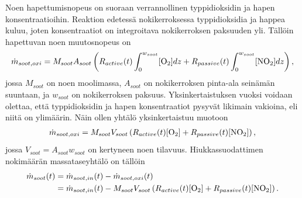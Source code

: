 Noen hapettumisnopeus on suoraan verrannollinen typpidioksidin ja hapen konsentraatioihin. Reaktion edetessä nokikerroksessa typpidioksidia ja happea kuluu, joten konsentraatiot on integroitava nokikerroksen paksuuden yli. Tällöin hapettuvan noen muutosnopeus on
\begin{align}
    \dot{m}_{soot, oxi} = M_{soot} A_{soot}\left(R_{active}(t) \int_0^{w_{soot}} [\ce{O2}] dz +
                                                R_{passive}(t) \int_0^{w_{soot}} [\ce{NO2}] dz
    \right),
\end{align}
jossa \(M_{soot}\) on noen moolimassa, \(A_{soot}\) on nokikerroksen pinta-ala seinämän suuntaan, ja \(w_{soot}\) on nokikerroksen paksuus. Yksinkertaistuksen vuoksi voidaan olettaa, että typpidioksidin ja hapen konsentraatiot pysyvät likimain vakioina, eli niitä on ylimäärin. Näin ollen yhtälö yksinkertaistuu muotoon
\begin{align}
    \dot{m}_{soot, oxi} = M_{soot}V_{soot} \left( R_{active}(t)[\ce{O2}] + R_{passive}(t)[\ce{NO2}] \right),
\end{align}
jossa \(V_{soot}=A_{soot}w_{soot}\) on kertyneen noen tilavuus.
Hiukkassuodattimen nokimäärän massataseyhtälö on tällöin
\begin{align}
\begin{split}
    \dot{m} _{soot}(t) &= \dot{m} _{soot, in}(t) - \dot{m} _{soot, oxi}(t)
    \\ & = \dot{m}_{soot, in}(t) - M_{soot}V_{soot} \left( R_{active}(t)[\ce{O2}] + R_{passive}(t)[\ce{NO2}] \right).
\end{split}
\end{align}

